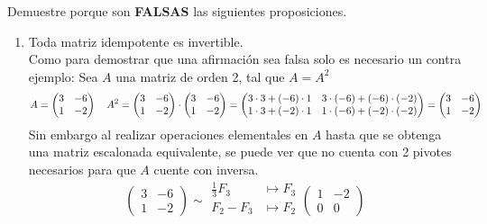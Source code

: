 \item Demuestre porque son \textbf{FALSAS} las siguientes proposiciones.
    \begin{enumerate}[label=\listAlph]
        \item Toda matriz idempotente es invertible. \\
            Como para demostrar que una afirmación sea falsa solo es necesario un contra ejemplo:
            Sea \(A\) una matriz de orden 2, tal que \(A = A^2\)
            \[
                A = \begin{pmatrix}
                    3 & -6 \\
                    1 & -2
                \end{pmatrix}
                \hspace{0.35cm}
                A^2 = 
                \begin{pmatrix}
                    3 & -6 \\
                    1 & -2
                \end{pmatrix}
                \cdot 
                \begin{pmatrix}
                    3 & -6 \\
                    1 & -2
                \end{pmatrix}
                =
                \begin{pmatrix}
                    3 \cdot 3 + (-6) \cdot 1 & 3 \cdot (-6) + (-6) \cdot (-2) \\
                    1 \cdot 3 + (-2) \cdot 1 & 1 \cdot (-6) + (-2) \cdot (-2)
                \end{pmatrix}
                =
                \begin{pmatrix}
                    3 & -6 \\
                    1 & -2
                \end{pmatrix}
            \]
            Sin embargo al realizar operaciones elementales en \(A\) hasta que se obtenga una matriz escalonada equivalente, se 
            puede ver que no cuenta con 2 pivotes necesarios para que \(A\) cuente con inversa.
            \[
                \begin{pmatrix}
                    3 & -6 \\
                    1 & -2
                \end{pmatrix}
                \sim
                \begin{aligned}
                    \frac{1}{3}F_3 &\mapsto F_3 \\
                    F_2 - F_3 &\mapsto F_2 \\
                \end{aligned}
                \begin{pmatrix}
                    1 & -2 \\
                    0 & 0
                \end{pmatrix}
            \]
        

\end{enumerate}

